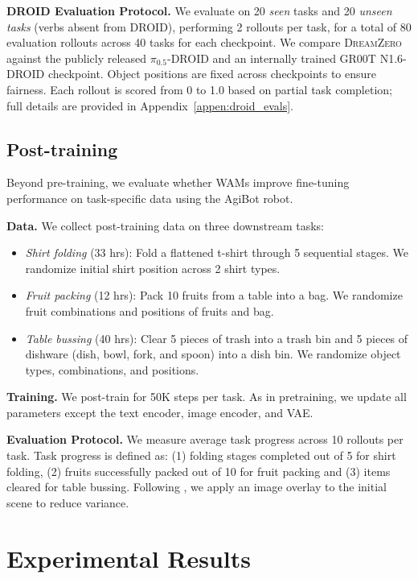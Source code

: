 \documentclass[10pt,logo,copyright]{nvidiatechreport}
\newcommand{\ourmethod}{\mbox{\textsc{DreamZero}}\xspace}
\begin{document}
\textbf{DROID Evaluation Protocol.} We evaluate on 20 \textit{seen} tasks and 20 \textit{unseen tasks} (verbs absent from DROID), performing 2 rollouts per task, for a total of 80 evaluation rollouts across 40 tasks for each checkpoint. We compare \ourmethod against the publicly released $\pi_{0.5}$-DROID and an internally trained GR00T N1.6-DROID checkpoint. Object positions are fixed across checkpoints to ensure fairness. Each rollout is scored from 0 to 1.0 based on partial task completion; full details are provided in Appendix~\ref{appen:droid_evals}.

\subsection{Post-training}

Beyond pre-training, we evaluate whether WAMs improve fine-tuning performance on task-specific data using the AgiBot robot.

\textbf{Data.} We collect post-training data on three downstream tasks:
\begin{itemize}[leftmargin=*, itemsep=2pt, topsep=2pt]
    \item \textit{Shirt folding} (33 hrs): Fold a flattened t-shirt through 5 sequential stages. We randomize initial shirt position across 2 shirt types. 
    \item \textit{Fruit packing} (12 hrs): Pack 10 fruits from a table into a bag. We randomize fruit combinations and positions of fruits and bag. 
    \item \textit{Table bussing} (40 hrs): Clear 5 pieces of trash into a trash bin and 5 pieces of dishware (dish, bowl, fork, and spoon) into a dish bin. We randomize object types, combinations, and positions.
\end{itemize}

\textbf{Training.} We post-train for 50K steps per task. As in pretraining, we update all parameters except the text encoder, image encoder, and VAE.

\textbf{Evaluation Protocol.} We measure average task progress across 10 rollouts per task.
Task progress is defined as: (1) folding stages completed out of 5 for shirt folding, (2) fruits successfully packed out of 10 for fruit packing and (3) items cleared for table bussing. Following \citet{barreiros2025careful}, we apply an image overlay to the initial scene to reduce variance.



\section{Experimental Results}
\label{sec:result}
\end{document}
